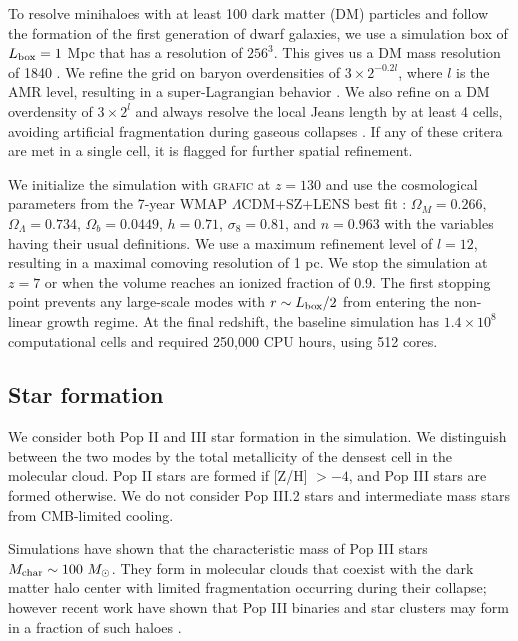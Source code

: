 \documentclass[useAMS,usenatbib]{mn2e}
\begin{document}
To resolve minihaloes with at least 100 dark matter (DM) particles and
follow the formation of the first generation of dwarf galaxies, we use
a simulation box of $L_{\rm box} = 1$ Mpc that has a resolution of
$256^3$.  This gives us a DM mass resolution of 1840 \Ms.  We refine
the grid on baryon overdensities of $3 \times 2^{-0.2l}$, where $l$ is
the AMR level, resulting in a super-Lagrangian behavior \citep[also
see][]{OShea08}.  We also refine on a DM overdensity of $3 \times 2^l$
and always resolve the local Jeans length by at least 4 cells,
avoiding artificial fragmentation during gaseous collapses
\citep{Truelove97}.  If any of these critera are met in a single cell,
it is flagged for further spatial refinement.

We initialize the simulation with \textsc{grafic}
\citep{Bertschinger01} at $z = 130$ and use the cosmological
parameters from the 7-year WMAP $\Lambda$CDM+SZ+LENS best fit
\citep{WMAP7}: $\Omega_M = 0.266$, $\Omega_\Lambda = 0.734$, $\Omega_b
= 0.0449$, $h = 0.71$, $\sigma_8 = 0.81$, and $n = 0.963$ with the
variables having their usual definitions.  We use a maximum refinement
level of $l = 12$, resulting in a maximal comoving resolution of 1 pc.
We stop the simulation at $z=7$ or when the volume reaches an ionized
fraction of 0.9.  The first stopping point prevents any large-scale
modes with $r \sim L_{\rm box}/2$ from entering the non-linear growth
regime.  At the final redshift, the baseline simulation has $1.4
\times 10^8$ computational cells and required 250,000 CPU hours, using
512 cores.

\subsection{Star formation}

We consider both Pop II and III star formation in the simulation.  We
distinguish between the two modes by the total metallicity of the
densest cell in the molecular cloud.  Pop II stars are formed if [Z/H]
$> -4$, and Pop III stars are formed otherwise.  We do not consider
Pop III.2 stars and intermediate mass stars from CMB-limited cooling.

Simulations have shown that the characteristic mass of Pop III stars
$M_{\rm char} \sim 100~\Ms$.  They form in molecular clouds that
coexist with the dark matter halo center with limited fragmentation
occurring during their collapse; however recent work have shown that
Pop III binaries and star clusters may form in a fraction of such
haloes \citep{2009Sci...325..601T, Stacy10_Binary, Greif11_P3Cluster}.
\end{document}
